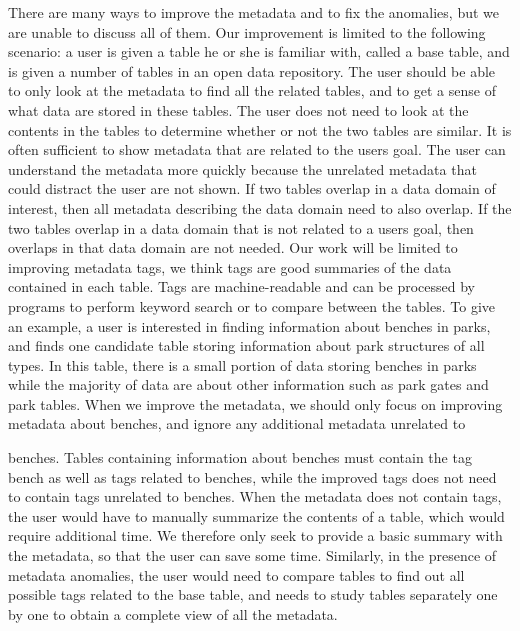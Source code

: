There are many ways to improve the metadata and to fix the anomalies, but we are unable to discuss all of them. Our improvement is limited to the following scenario: a user is given a table he or she is familiar with, called a base table, and is given a number of tables in an open data repository. The user should be able to only look at the metadata to find all the related tables, and to get a sense of what data are stored in these tables. The user does not need to look at the contents in the tables to determine whether or not the two tables are similar.
It is often sufficient to show metadata that are related to the users goal. The user can understand the metadata more quickly because the unrelated metadata that could distract the user are not shown. If two tables overlap in a data domain of interest, then all metadata describing the data domain need to also overlap. If the two tables overlap in a data domain that is not related to a users goal, then overlaps in that data domain are not needed. Our work will be limited to improving metadata tags, we think tags are good summaries of the data contained in each table. Tags are machine-readable and can be processed by programs to perform keyword search or to compare between the tables.
To give an example, a user is interested in finding information about benches in parks, and finds one candidate table storing information about park structures of all types. In this table, there is a small portion of data storing benches in parks while the majority of data are about other information such as park gates and park tables. When we improve the metadata, we should only focus on improving metadata about benches, and ignore any additional metadata unrelated to


benches. Tables containing information about benches must contain the tag bench as well as tags related to benches, while the improved tags does not need to contain tags unrelated to benches.
When the metadata does not contain tags, the user would have to manually summarize the contents of a table, which would require additional time. We therefore only seek to provide a basic summary with the metadata, so that the user can save some time. Similarly, in the presence of metadata anomalies, the user would need to compare tables to find out all possible tags related to the base table, and needs to study tables separately one by one to obtain a complete view of all the metadata.

